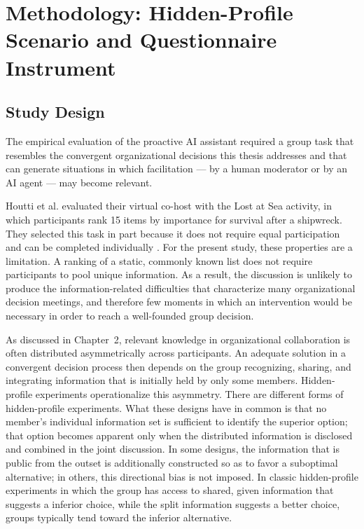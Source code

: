 \section{Methodology: Hidden-Profile Scenario and Questionnaire Instrument}
\subsection{Study Design}

The empirical evaluation of the proactive AI assistant required a group task that resembles the
convergent organizational decisions this thesis addresses and that can generate situations in which
facilitation --- by a human moderator or by an AI agent --- may become relevant.

Houtti et al.\cite{houttiObserveAskIntervene2025} evaluated their virtual co-host with the Lost at Sea
activity, in which participants rank 15 items by importance for survival after a shipwreck.
They selected this task in part because it does not require equal participation and can be completed
individually \cite{houttiObserveAskIntervene2025}.
For the present study, these properties are a limitation.
A ranking of a static, commonly known list does not require participants to pool unique information.
As a result, the discussion is unlikely to produce the information-related difficulties that
characterize many organizational decision meetings, and therefore few moments in which an
intervention would be necessary in order to reach a well-founded group decision.

As discussed in Chapter~2, relevant knowledge in organizational collaboration is often distributed
asymmetrically across participants.
An adequate solution in a convergent decision process then depends on the group recognizing,
sharing, and integrating information that is initially held by only some members.
Hidden-profile experiments operationalize this asymmetry. There are different forms of hidden-profile experiments.
What these designs have in common is that no member's individual information set is sufficient to
identify the superior option; that option becomes apparent only when the distributed information is
disclosed and combined in the joint discussion.
In some designs, the information that is public from the outset is additionally constructed so as to
favor a suboptimal alternative; in others, this directional bias is not imposed.
In classic hidden-profile experiments in which the group has access to shared, given information
that suggests a inferior choice, while the split information suggests a better
choice, groups typically tend toward the inferior alternative. \cite{arkesInformationExchangeGroup2009}

